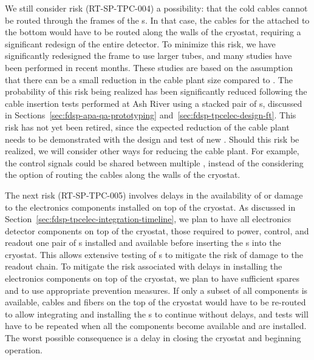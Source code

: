 We still consider risk (RT-SP-TPC-004) a possibility: that the cold cables cannot
be routed through the frames of the s. In that case, the cables for the
 attached to the bottom  would have to be routed along the
walls of the cryostat, requiring a significant redesign of the entire detector. 
To minimize this risk, we have significantly redesigned the  frame 
to use larger tubes, and many studies have been performed in recent months.
These studies are based on the assumption that there can be a small reduction in
the cable plant size compared to . The probability of this risk
being realized has been significantly reduced following the cable insertion
tests performed at Ash River using a stacked pair of s, discussed
in Sections~\ref{sec:fdsp-apa-qa-prototyping} and~\ref{sec:fdsp-tpcelec-design-ft}.
This risk has not yet been retired, since the expected reduction of the cable plant 
needs to be demonstrated with the design and test of new . Should
this risk be realized, we will consider other ways for reducing the cable 
plant. For example, the control signals could be shared between multiple 
, instead of the considering the option of routing the 
cables along the walls of the cryostat.

The next risk (RT-SP-TPC-005) involves delays in the availability of or
damage to the  electronics components installed on top of the
cryostat. As discussed in Section~\ref{sec:fdsp-tpcelec-integration-timeline},
we plan to have all  electronics detector components on top of the cryostat, those 
required to power, control, and readout one pair of s installed
and available before inserting the s into the cryostat.
This allows extensive testing of s to mitigate
the risk of damage to the readout chain. To mitigate the risk associated with
delays in installing the  electronics components on top of the cryostat,
we plan to have sufficient spares and to use appropriate  
prevention measures. If only a subset of all components is available, cables 
and fibers on the top of the cryostat would have to be re-routed to allow  
integrating and installing the s to continue without delays, 
and tests will have to be repeated when all the components become available 
and are installed. The worst possible consequence is a delay in closing 
the cryostat and beginning operation. 

